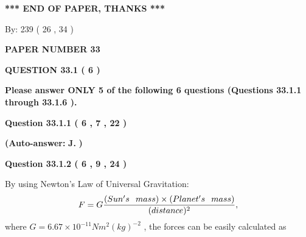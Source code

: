 \documentclass[12pt]{article}
\begin{document}
   
   
   
   
\vspace{1.0in} 
{\textbf{\large{ *** END OF PAPER, THANKS *** }}} 
   
   
\hspace{1.0in} By: 
         239 (          26 ,           34 )
   
   
   
   
\newpage 
\setcounter{page}{ 
    33001 } 
   
   
 {\textbf{ \Large{ PAPER NUMBER           33  }}}
   
   
   
   
  
\vspace{0.2in}
  
{\textbf{\Large{QUESTION
33.1 
 (           6 )
}}}
  
  
{\textbf{\Large{Please answer ONLY  %
           5  %
 of the following  %
           6  %
 questions (Questions  %
33.1.1 %
 through  %
33.1.6 %
 ). }}}
   
   
  
  
{\textbf{\large{Question
33.1.1 
 (           6 ,           7 ,          22 )
}}}
 
 
{\textbf{(Auto-answer:}}
{\textbf{\large{
J.}}}
{\textbf{)}}
 
 
  
  
{\textbf{\large{Question
33.1.2 
 (           6 ,           9 ,          24 )
}}}

By using Newton's Law of Universal Gravitation:
\[
F=G \frac{(Sun's \hspace{0.1in} mass) \times (Planet's \hspace{0.1in} mass)} { (distance)^2},
\]
where
$ G= %
6.67 \times 10^{-11} N m^{2}(kg)^{-2}$ , the forces can be easily calculated as
 
\vspace{0.2in}
 
\end{document}
